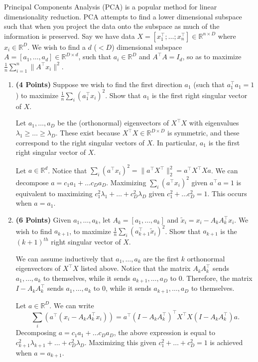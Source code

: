 \documentclass[a4paper]{article}
\theoremstyle{definition}
\newcommand{\RR}{\mathbb{R}}
\newenvironment{soln}{
    \leavevmode\color{blue}\ignorespaces
}{}
\begin{document}
Principal Components Analysis (PCA) is a popular method for linear dimensionality reduction. PCA attempts to find a lower dimensional subspace such that when you project the data onto the subspace as much of the information is preserved. Say we have data $X = [x_1^\top; \dots; x_n^\top] \in \RR^{n\times D}$ where  $x_i \in \RR^D$. We wish to find a $d$ ($ < D$) dimensional subspace $A = [a_1, \dots, a_d] \in \RR^{D\times d}$, such that $ a_i \in \RR^D$ and $A^\top A = I_d$, so as to maximize $\frac{1}{n} \sum_{i=1}^n \|A^\top x_i\|^2$.
\begin{enumerate}

\item  \textbf{(4 Points)}
Suppose we wish to find the first direction $a_1$ (such that $a_1^\top a_1 = 1$) to maximize $\frac{1}{n} \sum_i (a_1^\top x_i)^2$.
        Show that $a_1$ is the first right singular vector of $X$.

\begin{soln}
  Let $a_{1},\dots,a_{D}$ be the (orthonormal) eigenvectors of $X^{\top}X$ with eigenvalues $\lambda_{1}\ge \dots \ge \lambda_{D}$. These exist because $X^{\top}X\in \RR^{D\times D}$ is symmetric, and these correspond to the right singular vectors of $X$. In particular, $a_{1}$ is the first right singular vector of $X$.

  Let $a\in\RR^{d}$. Notice that $\sum_{i} (a^{\top} x_{i})^{2} = \|a^{\top}X^{\top}\|_{2}^{2}=a^{\top}X^{\top}Xa$. We can decompose $a=c_{1}a_{1}+\dots c_{D}a_{D}$. Maximizing $\sum_{i} (a^{\top} x_{i})^{2}$ given $a^{\top}a=1$ is equivalent to maximizing $c_{1}^{2}\lambda_{1}+\dots+c_{D}^{2}\lambda_{D}$ given $c_{1}^{2}+\dots c_{D}^{2}=1$. This occurs when $a=a_{1}$.
\end{soln}

\item  \textbf{(6 Points)}
Given $a_1, \dots, a_k$, let $A_k = [a_1, \dots, a_k]$ and
$\tilde{x}_i = x_i - A_kA_k^\top x_i$. We wish to find $a_{k+1}$, to maximize
$\frac{1}{n} \sum_i (a_{k+1}^\top \tilde{x}_i)^2$. Show that $a_{k+1}$ is the
$(k+1)^{th}$ right singular vector of $X$.

\begin{soln}
  We can assume inductively that $a_{1},\dots,a_{k}$ are the first $k$ orthonormal eigenvectors of $X^{\top}X$ listed above. Notice that the matrix $A_{k}A_{k}^{\top}$ sends $a_{1},\dots,a_{k}$ to themselves, while it sends $a_{k+1},\dots,a_{D}$ to 0. Therefore, the matrix $I-A_{k}A_{k}^{\top}$ sends $a_{1},\dots,a_{k}$ to 0, while it sends $a_{k+1},\dots,a_{D}$ to themselves.

  Let $a\in \RR^{D}$. We can write
  \[ \sum_{i} (a^{\top}(x_{i}-A_{k}A_{k}^{\top}x_{i})) = a^{\top}(I-A_{k}A_{k}^{\top})^{\top}X^{\top}X(I-A_{k}A_{k}^{\top})a. \]
  Decomposing $a=c_{1}a_{1}+\dots c_{D}a_{D}$, the above expression is equal to $c_{k+1}^{2}\lambda_{k+1}+\dots+c_{D}^{2}\lambda_{D}$. Maximizing this given $c_{1}^{2}+\dots+c_{D}^{2}=1$ is achieved when $a=a_{k+1}$.
\end{soln}

\end{enumerate}
\end{document}
